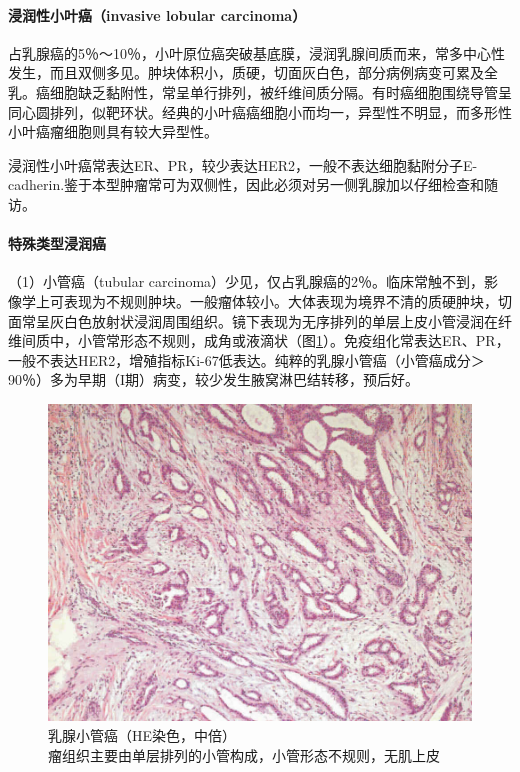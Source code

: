 \paragraph{浸润性小叶癌（invasive lobular carcinoma）}
占乳腺癌的5％～10％，小叶原位癌突破基底膜，浸润乳腺间质而来，常多中心性发生，而且双侧多见。肿块体积小，质硬，切面灰白色，部分病例病变可累及全乳。癌细胞缺乏黏附性，常呈单行排列，被纤维间质分隔。有时癌细胞围绕导管呈同心圆排列，似靶环状。经典的小叶癌癌细胞小而均一，异型性不明显，而多形性小叶癌瘤细胞则具有较大异型性。

浸润性小叶癌常表达ER、PR，较少表达HER2，一般不表达细胞黏附分子E-cadherin.鉴于本型肿瘤常可为双侧性，因此必须对另一侧乳腺加以仔细检查和随访。

\paragraph{特殊类型浸润癌}
（1）小管癌（tubular
carcinoma）少见，仅占乳腺癌的2％。临床常触不到，影像学上可表现为不规则肿块。一般瘤体较小。大体表现为境界不清的质硬肿块，切面常呈灰白色放射状浸润周围组织。镜下表现为无序排列的单层上皮小管浸润在纤维间质中，小管常形态不规则，成角或液滴状（图\ref{fig11-17}）。免疫组化常表达ER、PR，一般不表达HER2，增殖指标Ki-67低表达。纯粹的乳腺小管癌（小管癌成分＞90％）多为早期（I期）病变，较少发生腋窝淋巴结转移，预后好。

\begin{figure}[!htbp]
 \centering
 \includegraphics{./images/Image00204.jpg}
 \captionsetup{justification=centering}
 \caption{乳腺小管癌（HE染色，中倍）\\ {\small 瘤组织主要由单层排列的小管构成，小管形态不规则，无肌上皮}}
\label{fig11-17}
  \end{figure}

